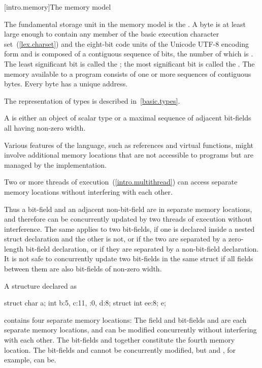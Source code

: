 [intro.memory]{The \Cpp memory model}

\pnum
{}%
The fundamental storage unit in the \Cpp memory model is the
.
A byte is at least large enough to contain any member of the basic
%
execution character set~(\ref{lex.charset})
and the eight-bit code units of the Unicode UTF-8 encoding form
and is composed of a contiguous sequence of
bits, the number of which is . The least
significant bit is called the ; the most
significant bit is called the . The memory
available to a \Cpp program consists of one or more sequences of
contiguous bytes. Every byte has a unique address.

\pnum
\begin{note} The representation of types is described
in~\ref{basic.types}. \end{note}

\pnum
A  is either an object of scalar type or a maximal
sequence of adjacent bit-fields all having non-zero width. \begin{note} Various
features of the language, such as references and virtual functions, might
involve additional memory locations that are not accessible to programs but are
managed by the implementation. \end{note} Two or more threads of
execution~(\ref{intro.multithread}) can access separate memory
locations without interfering with each other.

\pnum
\begin{note} Thus a bit-field and an adjacent non-bit-field are in separate memory
locations, and therefore can be concurrently updated by two threads of execution
without interference. The same applies to two bit-fields, if one is declared
inside a nested struct declaration and the other is not, or if the two are
separated by a zero-length bit-field declaration, or if they are separated by a
non-bit-field declaration. It is not safe to concurrently update two bit-fields
in the same struct if all fields between them are also bit-fields of non-zero
width. \end{note}

\pnum
\begin{example} A structure declared as

\begin{codeblock}
struct {
  char a;
  int b:5,
  c:11,
  :0,
  d:8;
  struct {int ee:8;} e;
}
\end{codeblock}

contains four separate memory locations: The field  and bit-fields
 and  are each separate memory locations, and can be
modified concurrently without interfering with each other. The bit-fields
 and  together constitute the fourth memory location. The
bit-fields  and  cannot be concurrently modified, but
 and , for example, can be. \end{example}%

